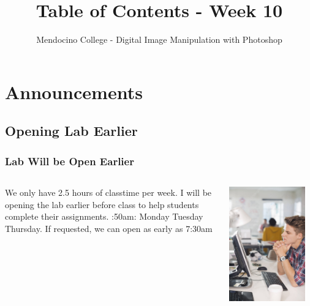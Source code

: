 \documentclass{beamer}
\title{Table of Contents - Week 10}
\author{Mendocino College - Digital Image Manipulation with Photoshop}
\date{\vspace{-5em}}
\begin{document}
	{
		\begin{frame}
			\vspace{-35pt}
			\maketitle
		\end{frame}
	}

		\section{Announcements}
			\subsection{Opening Lab Earlier}		
			\begin{frame}
				\frametitle{Lab Will be Open Earlier}
				\begin{columns}
					\column{.6\textwidth}
					\vspace{-25pt}
					\begin{outline}
						\1 We only have 2.5 hours of classtime per week.
						\1 I will be opening the lab earlier before class to help students complete their assignments.
						:50am: Monday Tuesday Thursday.
						\1 If requested, we can open as early as 7:30am
					\end{outline}
					\column{.45\textwidth}
					\includegraphics[width=0.9\textwidth]{images/F0136159-Businessman_working_at_computer_at_desk.jpg}
				\end{columns}
			\end{frame}
			
\end{document}
